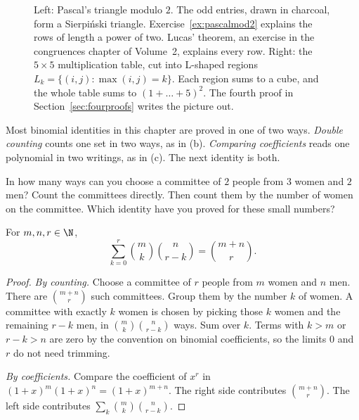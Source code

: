 
\begin{figure}[ht]
\centering
{}
\caption{Left: Pascal's triangle modulo $2$. The odd entries, drawn in charcoal, form a Sierpi\'nski triangle. Exercise~\ref{ex:pascalmod2} explains the rows of length a power of two. Lucas' theorem, an exercise in the congruences chapter of Volume~2, explains every row. Right: the $5\times5$ multiplication table, cut into L-shaped regions $L_k=\{(i,j):\max(i,j)=k\}$. Each region sums to a cube, and the whole table sums to $(1+\dots+5)^2$. The fourth proof in Section~\ref{sec:fourproofs} writes the picture out.}
\label{fig:pascal}
\end{figure}

Most binomial identities in this chapter are proved in one of two ways. \emph{Double counting} counts one set in two ways, as in (b). \emph{Comparing coefficients} reads one polynomial in two writings, as in (c). The next identity is both.

\begin{think}
In how many ways can you choose a committee of $2$ people from $3$ women and $2$ men? Count the committees directly. Then count them by the number of women on the committee. Which identity have you proved for these small numbers?
\end{think}

\begin{proposition}[Vandermonde]\label{prop:vandermonde}
For $m,n,r\in\N$,
\[
\sum_{k=0}^{r}\binom mk\binom n{r-k}=\binom{m+n}{r}.
\]
\end{proposition}
\begin{proof}
\emph{By counting.} Choose a committee of $r$ people from $m$ women and $n$ men. There are $\binom{m+n}{r}$ such committees. Group them by the number $k$ of women. A committee with exactly $k$ women is chosen by picking those $k$ women and the remaining $r-k$ men, in $\binom mk\binom n{r-k}$ ways. Sum over $k$. Terms with $k>m$ or $r-k>n$ are zero by the convention on binomial coefficients, so the limits $0$ and $r$ do not need trimming.

\emph{By coefficients.} Compare the coefficient of $x^r$ in $(1+x)^m(1+x)^n=(1+x)^{m+n}$. The right side contributes $\binom{m+n}{r}$. The left side contributes $\sum_k\binom mk\binom n{r-k}$.
\end{proof}

